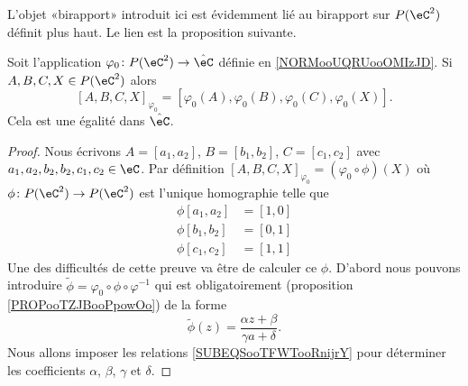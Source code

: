 L'objet «birapport» introduit ici est évidemment lié au birapport sur \( P(\eC^2)\) définit plus haut. Le lien est la proposition suivante.

\begin{proposition}
    Soit l'application \( \varphi_0\colon P(\eC^2)\to \hat\eC\) définie en \ref{NORMooUQRUooOMIzJD}. Si \( A,B,C,X\in P(\eC^2) \) alors
    \begin{equation}        \label{EQooEOZZooMRHJfH}
        [A,B,C,X]_{\varphi_0}=[\varphi_0(A),\varphi_0(B),\varphi_0(C),\varphi_0(X)].
    \end{equation}
    Cela est une égalité dans \( \hat \eC\).
\end{proposition}

\begin{proof}
    Nous écrivons \( A=[a_1,a_2]\), \( B=[b_1,b_2]\), \( C=[c_1,c_2]\) avec \( a_1,a_2,b_2,b_2,c_1,c_2\in \eC\). Par définition \( [A,B,C,X]_{\varphi_0}=(\varphi_0\circ\phi)(X)\) où \( \phi\colon P(\eC^2)\to P(\eC^2)\) est l'unique homographie telle que
    \begin{subequations}        \label{SUBEQSooTFWTooRnijrY}
        \begin{align}
            \phi[a_1,a_2]&=[1,0]\\
            \phi[b_1,b_2]&=[0,1]\\
            \phi[c_1,c_2]&=[1,1]
        \end{align}
    \end{subequations}
    Une des difficultés de cette preuve va être de calculer ce \( \phi\). D'abord nous pouvons introduire \( \tilde \phi=\varphi_0\circ\phi\circ\varphi^{-1}\) qui est obligatoirement (proposition \ref{PROPooTZJBooPpowOo}) de la forme
    \begin{equation}
        \tilde \phi(z)=\frac{ \alpha z+\beta }{ \gamma a+\delta }.
    \end{equation}
    Nous allons imposer les relations \eqref{SUBEQSooTFWTooRnijrY} pour déterminer les coefficients \( \alpha\), \( \beta\), \( \gamma\) et \( \delta\).


\end{proof}
